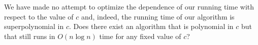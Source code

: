 \documentclass[lotsofwhite]{patmorin}
\begin{document}
We have made no attempt to optimize the dependence of our running time
with respect to the value of $c$ and, indeed, the running time of our
algorithm is superpolynomial in $c$. Does there exist an algorithm
that is polynomial in $c$ but that still runs in $O(n\log n)$ time for
any fixed value of $c$?



\end{document}
